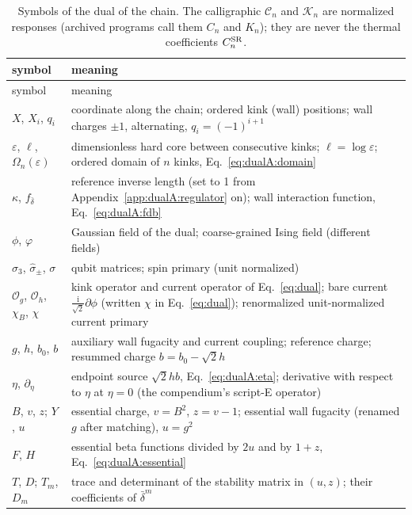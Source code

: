 \documentclass[11pt,a4paper]{article}
\numberwithin{equation}{section}
\newcommand{\CSR}{C^{\rm SR}}
\newcommand{\db}{\bar\delta}
\newcommand{\Og}{\mathcal O_g}
\newcommand{\Oh}{\mathcal O_h}
\begin{document}
{\small
\renewcommand{\arraystretch}{1.15}
\begin{longtable}{@{}>{\raggedright\arraybackslash}p{}>{\raggedright\arraybackslash}p{}@{}}
\caption{Symbols of the dual of the chain. The calligraphic $\mathcal C_n$ and $\mathcal K_n$ are normalized
responses (archived programs call them $C_n$ and $K_n$); they are never the thermal coefficients
$\CSR_n$.}\label{tab:dualA:notation}\\
\toprule
symbol & meaning\\
\midrule\endfirsthead
\toprule
symbol & meaning\\
\midrule\endhead
\bottomrule\endfoot
$X$, $X_i$, $q_i$ & coordinate along the chain; ordered kink (wall) positions; wall charges $\pm1$, alternating,
 $q_i=(-1)^{i+1}$\\
$\varepsilon$, $\ell$, $\Omega_n(\varepsilon)$ & dimensionless hard core between consecutive kinks; $\ell=\log\varepsilon$;
 ordered domain of $n$ kinks, Eq.~\eqref{eq:dualA:domain}\\
$\kappa$, $f_{\db}$ & reference inverse length (set to 1 from Appendix~\ref{app:dualA:regulator} on); wall
 interaction function, Eq.~\eqref{eq:dualA:fdb}\\
$\phi$, $\varphi$ & Gaussian field of the dual; coarse-grained Ising field (different fields)\\
$\hat\sigma_3$, $\hat\sigma_\pm$, $\sigma$ & qubit matrices; spin primary (unit normalized)\\
$\Og$, $\Oh$, $\chi_B$, $\chi$ & kink operator and current operator of Eq.~\eqref{eq:dual}; bare current
 $\frac{\mathrm i}{\sqrt2}\partial\phi$ (written $\chi$ in Eq.~\eqref{eq:dual}); renormalized unit-normalized current
 primary\\
$g$, $h$, $b_0$, $b$ & auxiliary wall fugacity and current coupling; reference charge; resummed charge
 $b=b_0-\sqrt2h$\\
$\eta$, $\partial_\eta$ & endpoint source $\sqrt2hb$, Eq.~\eqref{eq:dualA:eta}; derivative with respect to $\eta$ at
 $\eta=0$ (the compendium's script-E operator)\\
$B$, $v$, $z$; $Y$, $u$ & essential charge, $v=B^2$, $z=v-1$; essential wall fugacity (renamed $g$ after
 matching), $u=g^2$\\
$F$, $H$ & essential beta functions divided by $2u$ and by $1+z$, Eq.~\eqref{eq:dualA:essential}\\
$T$, $D$; $T_m$, $D_m$ & trace and determinant of the stability matrix in $(u,z)$; their coefficients of $\db^m$\\

\end{longtable}}
\end{document}

